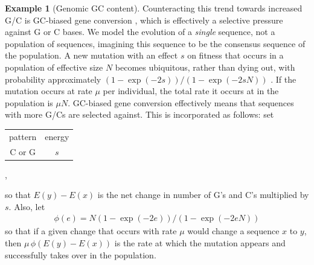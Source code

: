 \documentclass{article}
\newcommand{\nC}{\mbox{C}}
\newcommand{\nG}{\mbox{G}}
\theoremstyle{plain}
\theoremstyle{definition}
\newtheorem{example}{Example}[section]
\begin{document}
\begin{example}[Genomic GC content]
    Counteracting this trend towards increased G/C is GC-biased gene conversion \citep{glemin2015quantification},
    which is effectively a selective pressure against G or C bases.
    We model the evolution of a \emph{single} sequence, not a population of sequences,
    imagining this sequence to be the consensus sequence of the population.
    A new mutation with an effect $s$ on fitness that occurs
    in a population of effective size $N$ becomes ubiquitous, rather than dying out,
    with probability approximately $(1-\exp(-2 s))/(1-\exp(-2 s N))$ \citep{kimura1962probability}.
    If the mutation occurs at rate $\mu$ per individual, the total rate it occurs at in the population is $\mu N$.
    GC-biased gene conversion effectively means that sequences with more G/Cs are selected against.
    This is incorporated as follows: set
    \begin{center}
        \begin{tabular}{cc}
        pattern  &  energy \\
        \nC{} or \nG   &  $s$
      \end{tabular} ,
    \end{center}
    so that $E(y)-E(x)$ is the net change in number of G's and C's multiplied by $s$.
    Also, let
    \begin{align*}
        \phi(e) = N (1-\exp(-2e))/(1-\exp(-2eN))
    \end{align*}
    so that if a given change that occurs with rate $\mu$ would change a sequence $x$ to $y$,
    then $\mu \, \phi(E(y)-E(x))$ is the rate at which the mutation appears and successfully takes over in the population.

\end{example}
\end{document}
